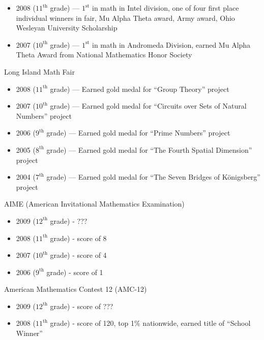 \documentclass [11pt]{res}
\begin{document}
\begin {itemize}
{\begin{itemize}
          \item
            2008 ($11^\text{th}$ grade) --- $1^\text{st}$ in math in Intel division, one of four first place individual winners in fair, Mu Alpha Theta award, Army award, Ohio Wesleyan University Scholarship
          \item
            2007 ($10^\text{th}$ grade) --- $1^\text{st}$ in math in Andromeda Division, earned Mu Alpha Theta Award from National Mathematics Honor Society
        \end{itemize}
      \item
        Long Island Math Fair
        \begin{itemize}
          \item
            2008 ($11^\text{th}$ grade) --- Earned gold medal for ``Group Theory'' project
          \item
            2007 ($10^\text{th}$ grade) --- Earned gold medal for ``Circuits over Sets of Natural Numbers'' project
          \item
            2006 ($9^\text{th}$ grade) --- Earned gold medal for ``Prime Numbers'' project
          \item
            2005 ($8^\text{th}$ grade) --- Earned gold medal for ``The Fourth Spatial Dimension'' project
          \item
            2004 ($7^\text{th}$ grade) --- Earned gold medal for ``The Seven Bridges of K\"onigsberg'' project
        \end{itemize}
      \item
        AIME (American Invitational Mathematics Examination)
        \begin{itemize}
          \item
            2009 ($12^\text{th}$ grade) - ???
          \item
            2008 ($11^\text{th}$ grade) - score of 8
          \item
            2007 ($10^\text{th}$ grade) - score of 4
          \item
            2006 ($9^\text{th}$ grade) - score of 1
        \end{itemize}
      \item
        American Mathematics Contest 12 (AMC-12)
        \begin{itemize}
          \item
            2009 ($12^\text{th}$ grade) - score of ???
          \item
            2008 ($11^\text{th}$ grade) - score of 120, top 1\% nationwide, earned title of ``School Winner''

\end{itemize}}
\end{itemize}
\end{document}
